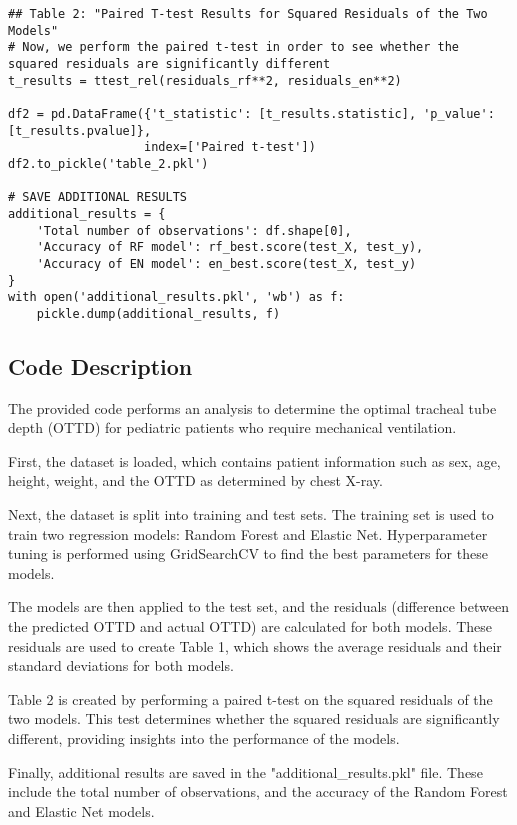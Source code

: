 \documentclass[11pt]{article}
\begin{document}
\begin{verbatim}
## Table 2: "Paired T-test Results for Squared Residuals of the Two Models"
# Now, we perform the paired t-test in order to see whether the squared residuals are significantly different
t_results = ttest_rel(residuals_rf**2, residuals_en**2)

df2 = pd.DataFrame({'t_statistic': [t_results.statistic], 'p_value': [t_results.pvalue]}, 
                   index=['Paired t-test'])
df2.to_pickle('table_2.pkl')

# SAVE ADDITIONAL RESULTS
additional_results = {
    'Total number of observations': df.shape[0], 
    'Accuracy of RF model': rf_best.score(test_X, test_y),
    'Accuracy of EN model': en_best.score(test_X, test_y)
}
with open('additional_results.pkl', 'wb') as f:
    pickle.dump(additional_results, f)

\end{verbatim}

\subsection{Code Description}

The provided code performs an analysis to determine the optimal tracheal tube depth (OTTD) for pediatric patients who require mechanical ventilation. 

First, the dataset is loaded, which contains patient information such as sex, age, height, weight, and the OTTD as determined by chest X-ray. 

Next, the dataset is split into training and test sets. The training set is used to train two regression models: Random Forest and Elastic Net. Hyperparameter tuning is performed using GridSearchCV to find the best parameters for these models.

The models are then applied to the test set, and the residuals (difference between the predicted OTTD and actual OTTD) are calculated for both models. These residuals are used to create Table 1, which shows the average residuals and their standard deviations for both models.

Table 2 is created by performing a paired t-test on the squared residuals of the two models. This test determines whether the squared residuals are significantly different, providing insights into the performance of the models.

Finally, additional results are saved in the "additional\_results.pkl" file. These include the total number of observations, and the accuracy of the Random Forest and Elastic Net models.
\end{document}
